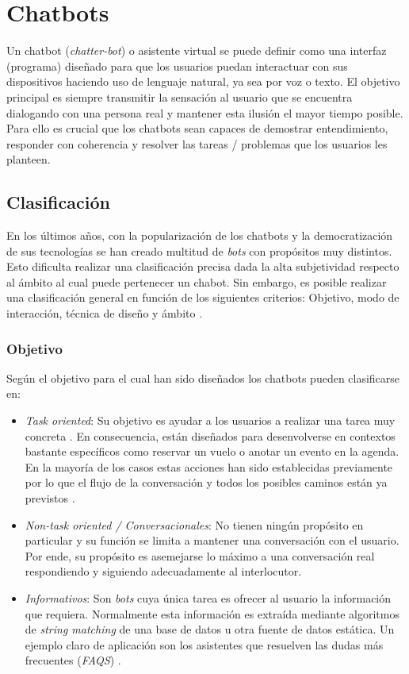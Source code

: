 \section{Chatbots}
Un chatbot (\textit{chatter-bot}) o asistente virtual se puede definir como una interfaz (programa) diseñado para que los usuarios puedan interactuar con sus dispositivos haciendo uso de lenguaje natural, ya sea por voz o texto. El objetivo principal es siempre transmitir la sensación al usuario que se encuentra dialogando con una persona real y mantener esta ilusión el mayor tiempo posible. Para ello es crucial que los chatbots sean capaces de demostrar entendimiento, responder con coherencia y resolver las tareas / problemas que los usuarios les planteen.\\

\subsection{Clasificación}
En los últimos años, con la popularización de los chatbots y la democratización de sus tecnologías se han creado multitud de \textit{bots} con propósitos muy distintos. Esto dificulta realizar una clasificación precisa dada la alta subjetividad respecto  al ámbito al cual puede pertenecer un chabot. Sin embargo, es posible realizar una clasificación general en función de los siguientes criterios: Objetivo, modo de interacción, técnica de diseño y ámbito \cite{designTechniques,chatbotTypes}.\\

\subsubsection{Objetivo}
Según el objetivo para el cual han sido diseñados los chatbots pueden clasificarse en:

\begin{itemize}
  \item \textit{Task oriented}: Su objetivo es ayudar a los usuarios a realizar una tarea muy concreta \cite{designTechniques}. En consecuencia, están diseñados para desenvolverse en contextos bastante específicos como reservar un vuelo o anotar un evento en la agenda. En la mayoría de los casos estas acciones han sido establecidas previamente por lo que el flujo de la conversación y todos los posibles caminos están ya previstos \cite{chatbotTypes}.
  \item \textit {Non-task oriented / Conversacionales}: No tienen ningún propósito en particular y su función se limita a mantener una conversación con el usuario. Por ende, su propósito es asemejarse lo máximo a una conversación real respondiendo y siguiendo adecuadamente al interlocutor.
  \item \textit {Informativos}: Son \textit{bots} cuya única tarea es ofrecer al usuario la información que requiera. Normalmente esta información es extraída mediante algoritmos de \textit{string matching} de una base de datos u otra fuente de datos estática. Un ejemplo claro de aplicación son los asistentes que resuelven las dudas más frecuentes (\textit{FAQS}) \cite{chatbotTypes}.
\end{itemize}


